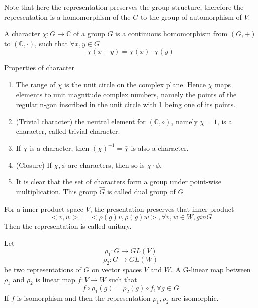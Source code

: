 \begin{refsection}
\begin{remark}
Note that here the representation preserves the group structure, therefore the representation is a homomorphism of the $G$ to the group of automorphism of $V$.
\end{remark}


\begin{definition}[character]
A character $\chi: G \rightarrow \mathbb{C}$ of a group $G$ is a continuous homomorphism from $(G,+)$ to $(\mathbb{C},\cdot)$, such that $\forall x,y \in G$
$$\chi(x+y)=\chi(x)\cdot \chi(y)$$
\end{definition}


\begin{theorem}
Properties of character
\begin{enumerate}
\item The range of $\chi$ is the unit circle on the complex plane. Hence $\chi$ maps elements to unit magnitude complex numbers, namely the points of the regular n-gon inscribed in the unit circle with 1 being one of its points.
\item (Trivial character) the neutral element for $(\mathbb{C},\circ)$, namely $\chi=1$, is a character, called trivial character.
\item If $\chi$ is a character, then $(\chi)^{-1}=\bar{\chi}$ is also a character.
\item (Closure) If $\chi,\phi$ are characters, then so is $\chi \cdot \phi$.
\item It is clear that the set of characters form a group under point-wise multiplication. This group $\hat{G}$ is called dual group of $G$
\end{enumerate}

\end{theorem}


\begin{definition}
For a inner product space $V$, the presentation preserves that inner product $$<v,w>=<\rho(g)v,\rho(g)w>,\forall v,w\in W, g in G$$
Then the representation is called unitary. 
\end{definition}



\begin{definition}
Let $$\rho_1:G \rightarrow GL(V)$$
$$\rho_2:G \rightarrow GL(W)$$ be two representations of $G$ on vector spaces $V$ and $W$. A G-linear map between $\rho_1$ and $\rho_2$ is linear map $f:V\rightarrow W$ such that
$$f\circ \rho_1(g)= \rho_2(g) \circ f, \forall g\in G$$
If $f$ is isomorphism and then the representation $\rho_1,\rho_2$ are isomorphic.
\end{definition}




\end{refsection}
